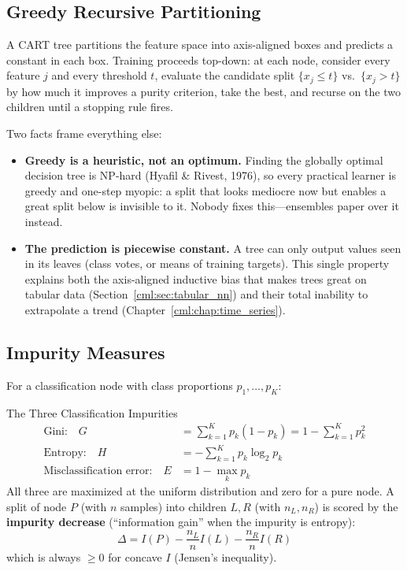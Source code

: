 \subsection{Greedy Recursive Partitioning}

A CART tree partitions the feature space into axis-aligned boxes and predicts a constant in each box. Training proceeds top-down: at each node, consider every feature $j$ and every threshold $t$, evaluate the candidate split $\{x_j \le t\}$ vs.\ $\{x_j > t\}$ by how much it improves a purity criterion, take the best, and recurse on the two children until a stopping rule fires.

Two facts frame everything else:
\begin{itemize}
    \item \textbf{Greedy is a heuristic, not an optimum.} Finding the globally optimal decision tree is NP-hard (Hyafil \& Rivest, 1976), so every practical learner is greedy and one-step myopic: a split that looks mediocre now but enables a great split below is invisible to it. Nobody fixes this---ensembles paper over it instead.
    \item \textbf{The prediction is piecewise constant.} A tree can only output values seen in its leaves (class votes, or means of training targets). This single property explains both the axis-aligned inductive bias that makes trees great on tabular data (Section~\ref{cml:sec:tabular_nn}) and their total inability to extrapolate a trend (Chapter~\ref{cml:chap:time_series}).
\end{itemize}

\subsection{Impurity Measures}

For a classification node with class proportions $p_1, \ldots, p_K$:

\begin{mathresult}{The Three Classification Impurities}
\begin{align}
\text{Gini:} \quad G &= \sum_{k=1}^{K} p_k(1 - p_k) = 1 - \sum_{k=1}^{K} p_k^2 \\
\text{Entropy:} \quad H &= -\sum_{k=1}^{K} p_k \log_2 p_k \\
\text{Misclassification error:} \quad E &= 1 - \max_k p_k
\end{align}
All three are maximized at the uniform distribution and zero for a pure node. A split of node $P$ (with $n$ samples) into children $L, R$ (with $n_L, n_R$) is scored by the \textbf{impurity decrease} (``information gain'' when the impurity is entropy):
\begin{equation}
\Delta = I(P) - \frac{n_L}{n} I(L) - \frac{n_R}{n} I(R)
\end{equation}
which is always $\ge 0$ for concave $I$ (Jensen's inequality).
\end{mathresult}

